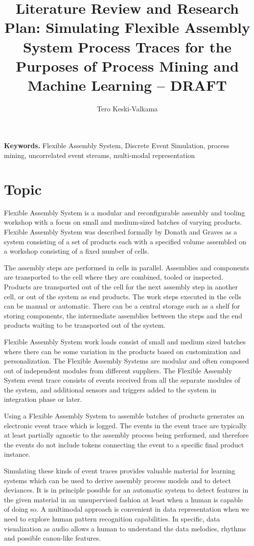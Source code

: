 \documentclass[a4paper,10pt]{article}
\title{Literature Review and Research Plan: Simulating Flexible Assembly System Process Traces for the Purposes of Process Mining and Machine Learning – DRAFT}
\author{Tero Keski-Valkama}
\begin{document}
\maketitle

\smallskip
\noindent \textbf{Keywords.} Flexible Assembly System, Discrete Event Simulation, process mining, uncorrelated event streams, multi-modal representation

\tableofcontents

\section{Topic}
Flexible Assembly System is a modular and reconfigurable assembly and tooling workshop with a focus on small and medium-sized batches of varying products.
Flexible Assembly System was described formally by Donath and Graves \cite{donath1988flexible} as a system consisting of a set of products each with a specified volume
assembled on a workshop consisting of a fixed number of cells.

The assembly steps are performed in cells in parallel. Assemblies and components are transported to the cell where they are combined, tooled or inspected. Products
are transported out of the cell for the next assembly step in another cell, or out of the system as end products.
The work steps executed in the cells can be manual or automatic. There can be a central storage such as a shelf for storing components, the intermediate assemblies between the steps
and the end products waiting to be transported out of the system.

Flexible Assembly System work loads consist of small and medium sized batches where there can be some variation in the products based on customization and personalization.
The Flexible Assembly Systems are modular and often composed out of independent modules from different suppliers. The Flexible Assembly System event trace consists
of events received from all the separate modules of the system, and additional sensors and triggers added to the system in integration phase or later.

Using a Flexible Assembly System to assemble batches of products generates an electronic event trace which is logged. The events in the event trace are typically at least
partially agnostic to the assembly process being performed, and therefore the events do not include tokens connecting the event to a specific final product instance.

Simulating these kinds of event traces provides valuable material for learning systems which can be used to derive assembly process models and to detect deviances.
It is in principle possible for an automatic system to detect features in the given material in an unsupervised fashion at least when a human is capable of doing so.
A multimodal approach is convenient in data representation when we need to explore human pattern recognition capabilities. In specific, data visualization as audio
allows a human to understand the data melodies, rhythms and possible canon-like features.
\end{document}
